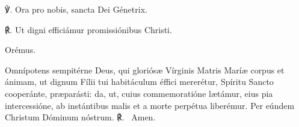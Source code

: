 ℣. Ora pro nobis, sancta Dei Génetrix.

℟. Ut digni efficiámur promissiónibus Christi.

Orémus.

Omnípotens sempitérne Deus, qui gloriósæ Vírginis Matris Maríæ corpus et ánimam, ut dignum Fílii tui habitáculum éffici mererétur, Spíritu Sancto cooperánte, præparásti: da, ut, cuius commemoratióne lætámur, eius pia intercessióne, ab instántibus malis et a morte perpétua liberémur. Per eúndem Christum Dóminum nóstrum.  ℟. ~Amen.